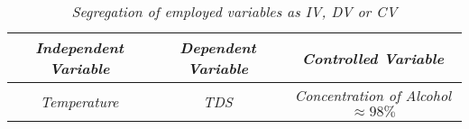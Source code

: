 

\begin{table}[H]
    \centering
        \begin{tabular}{|c|c|c|}
        \hline
        \hline
        \textit{Independent Variable} & \textit{Dependent Variable} & \textit{Controlled Variable} \\
        \hline
        \hline
        \textit{Temperature} & \textit{TDS} & \textit{Concentration of Alcohol $\approx 98\%$} \\
        \hline
        \hline
        \end{tabular}
    \caption{\textit{Segregation of employed variables as IV, DV or CV}}
\end{table}


